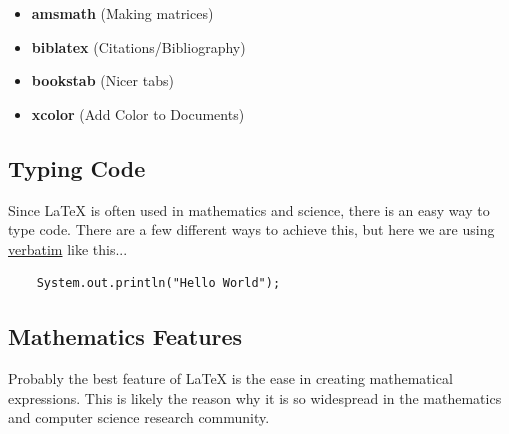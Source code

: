 \begin{itemize}
    \item \textbf{amsmath} (Making matrices)
    \item \textbf{biblatex} (Citations/Bibliography)
    \item \textbf{bookstab} (Nicer tabs)
    \item \textbf{xcolor} (Add Color to Documents)
\end{itemize}

\subsection{Typing Code}

Since LaTeX is often used in mathematics and science, there is an easy way to type code. There are a few different ways to achieve this, but here we are using \underline{verbatim} like this...

\begin{verbatim}
    System.out.println("Hello World");
\end{verbatim}

\subsection{Mathematics Features}

Probably the best feature of LaTeX is the ease in creating mathematical expressions. This is likely the reason why it is so widespread in the mathematics and computer science research community.
